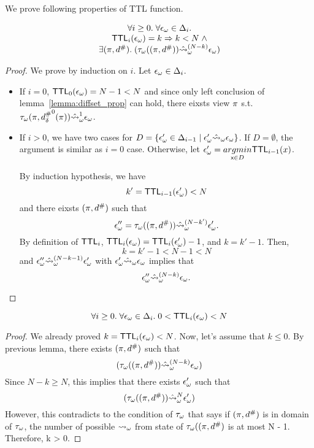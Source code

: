 We prove following properties of TTL function.
\begin{lemma}
  \[
    \begin{array}{c}
      \forall i \geq 0. \; \forall {\epsilon}_\omega \in \Delta_i. \\
      \textsf{TTL}_i({\epsilon}_\omega) = k \Rightarrow k < N \; \wedge \\
      \exists (\pi, {d}^{\#}). \; ({\tau}_\omega((\pi,{d}^{\#}))
      \hat{\leadsto}_\omega^{(N - k)} {\epsilon}_\omega) \\
    \end{array}
  \]
\end{lemma}
\begin{proof}
  We prove by induction on $i$.
  Let ${\epsilon}_\omega \in \Delta_i$.
  \begin{itemize}
  \item If $i = 0$, $\textsf{TTL}_0({\epsilon}_\omega) = N - 1 < N$
  and since only left conclusion of lemma~\ref{lemma:diffset_prop} can hold,
  there eixsts view $\pi$ s.t.
  ${\tau}_\omega(\pi, {{d}^{\#}_\delta}^0(\pi)) \hat{\leadsto}_\omega^1 {\epsilon}_\omega$.
  \item If $i > 0$, we have two cases for $D = 
    \{{\epsilon}_\omega' \in \Delta_{i-1} \mid {\epsilon}_\omega' \hat{\leadsto}_\omega {\epsilon}_\omega\}$.
  If $D = \emptyset$, the argument is similar as $i = 0$ case.
  Otherwise, let ${\epsilon}_\omega' = \underset{{\textsf{x}} \in D}{argmin}{\textsf{TTL}_{i-1}(x)}$.
  
  By induction hypothesis, we have
  \[
    k' = \textsf{TTL}_{i-1}({\epsilon}_\omega') < N
  \]
  and there eixsts $(\pi, {d}^{\#})$ such that
  \[
    {\epsilon}_\omega'' = {\tau}_\omega((\pi,{d}^{\#})) \hat{\leadsto}_\omega^{(N - k')} {\epsilon}_\omega'.
  \]
  By definition of $\textsf{TTL}_i$,
  $\textsf{TTL}_i({\epsilon}_\omega) = \textsf{TTL}_i({\epsilon}_\omega') - 1$, and $k = k' - 1$.
  Then,
  \[
    k = k' - 1 < N - 1 < N
  \]
  and
  ${\epsilon}_\omega'' \hat{\leadsto}_\omega^{(N - k - 1)} {\epsilon}_\omega'$ with
  ${\epsilon}_\omega' \hat{\leadsto}_\omega {\epsilon}_\omega$ implies that
  \[
    {\epsilon}_\omega'' \hat{\leadsto}_\omega^{(N - k)} {\epsilon}_\omega.
  \]
  \end{itemize}
\end{proof}
\begin{corollary}\label{corollary:ttl-range}
  \[
    \forall i \geq 0. \; \forall {\epsilon}_\omega \in \Delta_i. \;
    0 < \textsf{TTL}_i({\epsilon}_\omega) < N
  \]
\end{corollary}
\begin{proof}
We already proved $k = \textsf{TTL}_i({\epsilon}_\omega) < N$.
Now, let's assume that $k \leq 0$.
By previous lemma, there exists $(\pi, {d}^{\#})$ such that
\[
  ({\tau}_\omega((\pi,{d}^{\#})) \hat{\leadsto}_\omega^{(N - k)} {\epsilon}_\omega)
\]
Since $N - k \geq N$, this implies that there exists ${\epsilon}_\omega'$ such that
\[
  ({\tau}_\omega((\pi,{d}^{\#})) \hat{\leadsto}_\omega^N {\epsilon}_\omega')
\]
However, this contradicts to the condition of ${\tau}_\omega$ that says
if $(\pi,{d}^{\#})$ is in domain of ${\tau}_\omega$,
the number of possible ${\leadsto}_\omega$ from state of ${\tau}_\omega((\pi,{d}^{\#})$
is at most N - 1.
Therefore, k > 0.
\end{proof}

